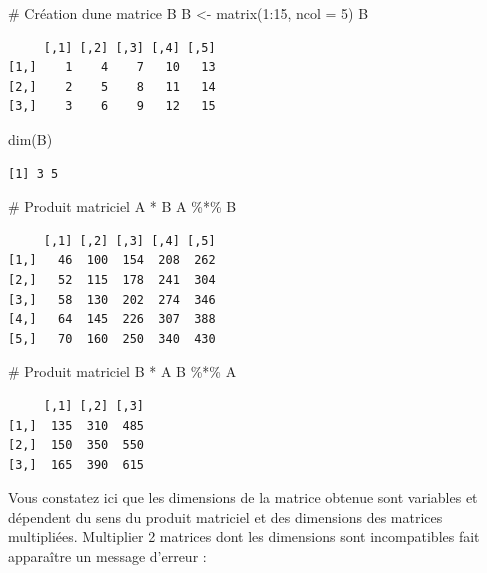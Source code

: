 \documentclass[
  french,
  a4paper,
  DIV=11,
  numbers=noendperiod,
  oneside]{scrreprt}
\newenvironment{Shaded}{}{}
\newcommand{\AttributeTok}[1]{\textcolor[rgb]{0.84,0.23,0.29}{#1}}
\newcommand{\CommentTok}[1]{\textcolor[rgb]{0.42,0.45,0.49}{#1}}
\newcommand{\DecValTok}[1]{\textcolor[rgb]{0.00,0.36,0.77}{#1}}
\newcommand{\FunctionTok}[1]{\textcolor[rgb]{0.44,0.26,0.76}{#1}}
\newcommand{\NormalTok}[1]{\textcolor[rgb]{0.14,0.16,0.18}{#1}}
\newcommand{\OtherTok}[1]{\textcolor[rgb]{0.44,0.26,0.76}{#1}}
\newcommand{\SpecialCharTok}[1]{\textcolor[rgb]{0.00,0.36,0.77}{#1}}
\begin{document}
\begin{tcolorbox}
\begin{Shaded}
\begin{Highlighting}[]
\CommentTok{\# Création d\textquotesingle{}une matrice B}
\NormalTok{B }\OtherTok{\textless{}{-}} \FunctionTok{matrix}\NormalTok{(}\DecValTok{1}\SpecialCharTok{:}\DecValTok{15}\NormalTok{, }\AttributeTok{ncol =} \DecValTok{5}\NormalTok{)}
\NormalTok{B}
\end{Highlighting}
\end{Shaded}

\begin{verbatim}
     [,1] [,2] [,3] [,4] [,5]
[1,]    1    4    7   10   13
[2,]    2    5    8   11   14
[3,]    3    6    9   12   15
\end{verbatim}

\begin{Shaded}
\begin{Highlighting}[]
\FunctionTok{dim}\NormalTok{(B)}
\end{Highlighting}
\end{Shaded}

\begin{verbatim}
[1] 3 5
\end{verbatim}

\begin{Shaded}
\begin{Highlighting}[]
\CommentTok{\# Produit matriciel A * B}
\NormalTok{A }\SpecialCharTok{\%*\%}\NormalTok{ B}
\end{Highlighting}
\end{Shaded}

\begin{verbatim}
     [,1] [,2] [,3] [,4] [,5]
[1,]   46  100  154  208  262
[2,]   52  115  178  241  304
[3,]   58  130  202  274  346
[4,]   64  145  226  307  388
[5,]   70  160  250  340  430
\end{verbatim}

\begin{Shaded}
\begin{Highlighting}[]
\CommentTok{\# Produit matriciel B * A}
\NormalTok{B }\SpecialCharTok{\%*\%}\NormalTok{ A}
\end{Highlighting}
\end{Shaded}

\begin{verbatim}
     [,1] [,2] [,3]
[1,]  135  310  485
[2,]  150  350  550
[3,]  165  390  615
\end{verbatim}

Vous constatez ici que les dimensions de la matrice obtenue sont
variables et dépendent du sens du produit matriciel et des dimensions
des matrices multipliées. Multiplier 2 matrices dont les dimensions sont
incompatibles fait apparaître un message d'erreur :


\end{tcolorbox}
\end{document}

